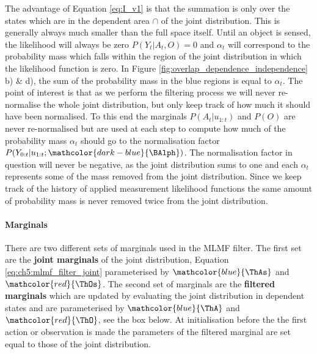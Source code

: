 The advantage of Equation \ref{eq:I_v1} is that the summation is only over the states which are in the dependent area $\cap$ of the joint 
distribution. This is generally always much smaller than the full space itself.
Until an object is sensed, the likelihood will always be zero $P(Y_t|A_t,O) = 0$ and $\alpha_t$ will correspond to the probability 
mass which falls within the region of the joint distribution in which the likelihood function is zero. In Figure 
\ref{fig:overlap_dependence_independence} b) \& d), the sum of the probability mass in the blue 
regions is equal to $\alpha_t$.
The point of interest is that as we perform the filtering process we will never re-normalise the whole joint distribution, but only keep 
track of how much it should have been normalised. To this end the marginals $P(A_t|u_{1:t})$ and $P(O)$  are never re-normalised but are used
at each step to compute how much of the probability mass $\alpha_t$ should go to the normalisation factor $P(Y_{0:t}|u_{1:t};\mathcolor{dark-blue}{\BAlph})$. 
The normalisation factor in question will never be negative, as the joint distribution sums to one and each $\alpha_t$ represents some of the mass removed from the joint distribution. Since we 
keep track of the history of applied  measurement likelihood functions the same amount of probability mass is never removed twice
from the joint distribution.

\paragraph{Marginals}

There are two different sets of marginals used in the MLMF filter. The first set are the \textbf{joint marginals} of the joint distribution, Equation \ref{eq:ch5:mlmf_filter_joint}
parameterised by $\mathcolor{blue}{\ThAs}$ and $\mathcolor{red}{\ThOs}$.
The second set of marginals are the \textbf{filtered marginals} which are updated by evaluating the joint distribution in dependent states and 
are parameterised by $\mathcolor{blue}{\ThA}$ and $\mathcolor{red}{\ThO}$, see the box below. At initialisation before the the first action or observation is made 
the parameters of the filtered marginal are set equal to those of the joint distribution.


